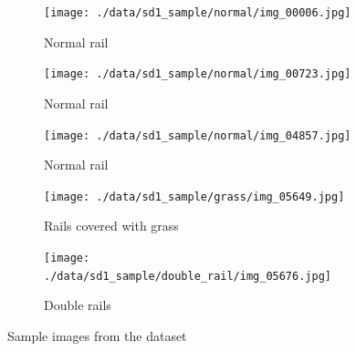 \begin{figure}[!ht]
    \centering
    \begin{subfigure}{0.3\textwidth}
        \centering
        \texttt{[image: ./data/sd1\_sample/normal/img\_00006.jpg]}
        \caption*{Normal rail}
    \end{subfigure}
    \begin{subfigure}{0.3\textwidth}
        \centering
        \texttt{[image: ./data/sd1\_sample/normal/img\_00723.jpg]}
        \caption*{Normal rail}
    \end{subfigure}
    \begin{subfigure}{0.3\textwidth}
        \centering
        \texttt{[image: ./data/sd1\_sample/normal/img\_04857.jpg]}
        \caption*{Normal rail}
    \end{subfigure}
    \begin{subfigure}{0.3\textwidth}
        \centering
        \texttt{[image: ./data/sd1\_sample/grass/img\_05649.jpg]}
        \caption*{Rails covered with grass}
    \end{subfigure}
    \begin{subfigure}{0.3\textwidth}
        \centering
        \texttt{[image: ./data/sd1\_sample/double\_rail/img\_05676.jpg]}
        \caption*{Double rails}
    \end{subfigure}
    \caption{Sample images from the dataset}
    \label{fig:example_images}
\end{figure}